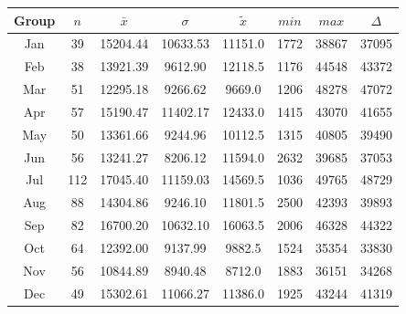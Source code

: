 \begin{figure}[ht!]
	\centering
	\begin{minipage}{0.5\textwidth}
		\tiny
		\setlength{\tabcolsep}{4pt}
		\centering
		\begin{tabular}{c|c|c|c|c|c|c|c}
			\toprule
			Group & $n$ & $\bar{x}$ & $\sigma$ & $\tilde{x}$ & $min$ & $max$ & $\Delta$ \\
			\midrule
			Jan & 39  & 15204.44 & 10633.53 & 11151.0 & 1772 & 38867 & 37095 \\ 
			Feb & 38  & 13921.39 & 9612.90  & 12118.5 & 1176 & 44548 & 43372 \\ 
			Mar & 51  & 12295.18 & 9266.62  & 9669.0  & 1206 & 48278 & 47072 \\ 
			Apr & 57  & 15190.47 & 11402.17 & 12433.0 & 1415 & 43070 & 41655 \\ 
			May & 50  & 13361.66 & 9244.96  & 10112.5 & 1315 & 40805 & 39490 \\ 
			Jun & 56  & 13241.27 & 8206.12  & 11594.0 & 2632 & 39685 & 37053 \\ 
			Jul & 112 & 17045.40 & 11159.03 & 14569.5 & 1036 & 49765 & 48729 \\ 
			Aug & 88  & 14304.86 & 9246.10  & 11801.5 & 2500 & 42393 & 39893 \\ 
			Sep & 82  & 16700.20 & 10632.10 & 16063.5 & 2006 & 46328 & 44322 \\ 
			Oct & 64  & 12392.00 & 9137.99  & 9882.5  & 1524 & 35354 & 33830 \\ 
			Nov & 56  & 10844.89 & 8940.48  & 8712.0  & 1883 & 36151 & 34268 \\ 
			Dec & 49  & 15302.61 & 11066.27 & 11386.0 & 1925 & 43244 & 41319 \\ 
			\bottomrule
		\end{tabular}
		\label{tbl:descriptives_baysis_effector_Month_SMax}
	\end{minipage}%
	\begin{minipage}{0.55\textwidth}
\end{minipage}
\end{figure}
